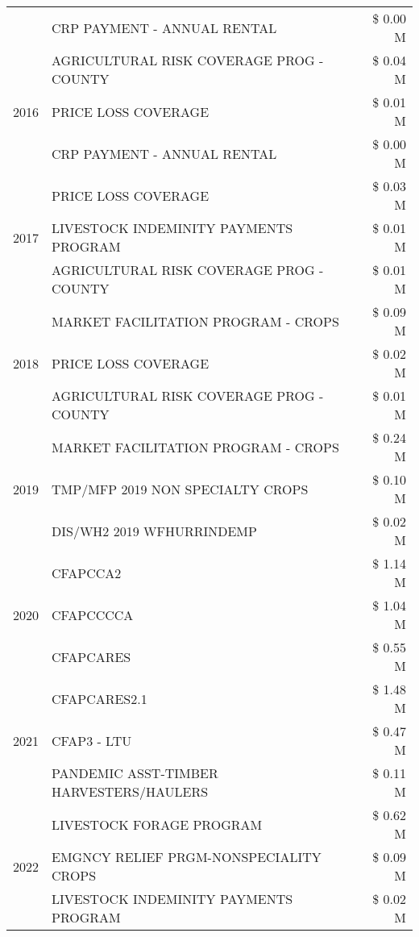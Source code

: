 \begin{tabular}{llr}
 & CRP PAYMENT - ANNUAL RENTAL & \$ 0.00 M \\
\cline{1-3}
\multirow[t]{3}{*}{2016} & AGRICULTURAL RISK COVERAGE PROG - COUNTY & \$ 0.04 M \\
 & PRICE LOSS COVERAGE & \$ 0.01 M \\
 & CRP PAYMENT - ANNUAL RENTAL & \$ 0.00 M \\
\cline{1-3}
\multirow[t]{3}{*}{2017} & PRICE LOSS COVERAGE & \$ 0.03 M \\
 & LIVESTOCK INDEMINITY PAYMENTS PROGRAM & \$ 0.01 M \\
 & AGRICULTURAL RISK COVERAGE PROG - COUNTY & \$ 0.01 M \\
\cline{1-3}
\multirow[t]{3}{*}{2018} & MARKET FACILITATION PROGRAM - CROPS & \$ 0.09 M \\
 & PRICE LOSS COVERAGE & \$ 0.02 M \\
 & AGRICULTURAL RISK COVERAGE PROG - COUNTY & \$ 0.01 M \\
\cline{1-3}
\multirow[t]{3}{*}{2019} & MARKET FACILITATION PROGRAM - CROPS & \$ 0.24 M \\
 & TMP/MFP 2019 NON SPECIALTY CROPS & \$ 0.10 M \\
 & DIS/WH2 2019 WFHURRINDEMP & \$ 0.02 M \\
\cline{1-3}
\multirow[t]{3}{*}{2020} & CFAPCCA2 & \$ 1.14 M \\
 & CFAPCCCCA & \$ 1.04 M \\
 & CFAPCARES & \$ 0.55 M \\
\cline{1-3}
\multirow[t]{3}{*}{2021} & CFAPCARES2.1 & \$ 1.48 M \\
 & CFAP3 - LTU & \$ 0.47 M \\
 & PANDEMIC ASST-TIMBER HARVESTERS/HAULERS & \$ 0.11 M \\
\cline{1-3}
\multirow[t]{3}{*}{2022} & LIVESTOCK FORAGE PROGRAM & \$ 0.62 M \\
 & EMGNCY RELIEF PRGM-NONSPECIALITY CROPS & \$ 0.09 M \\
 & LIVESTOCK INDEMINITY PAYMENTS PROGRAM & \$ 0.02 M \\
\cline{1-3}
\bottomrule
\end{tabular}
